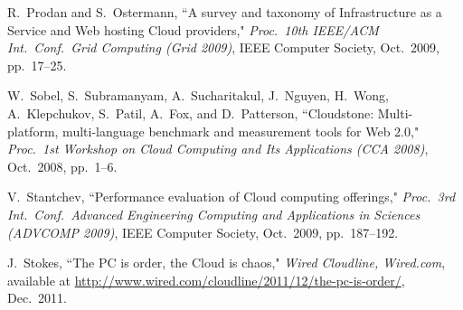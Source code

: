\documentclass[10pt, conference, compsocconf]{IEEEtran}
\begin{document}
\begin{thebibliography}{99}
R.~Prodan and S.~Ostermann, ``A survey and taxonomy of Infrastructure as a Service and Web hosting Cloud providers," \emph{Proc.~10th IEEE/ACM Int.~Conf.~Grid Computing (Grid 2009)}, IEEE Computer Society, Oct.~2009, pp.~17--25.

W.~Sobel, S.~Subramanyam, A.~Sucharitakul, J.~Nguyen, H.~Wong, A.~Klepchukov, S.~Patil, A.~Fox, and D.~Patterson, ``Cloudstone: Multi-platform, multi-language benchmark and measurement tools for Web 2.0," \emph{Proc.~1st Workshop on Cloud Computing and Its Applications (CCA 2008)}, Oct.~2008, pp.~1--6.

V.~Stantchev, ``Performance evaluation of Cloud computing offerings," \emph{Proc.~3rd Int.~Conf.~Advanced Engineering Computing and Applications in Sciences (ADVCOMP 2009)}, IEEE Computer Society, Oct.~2009, pp.~187--192.

J.~Stokes, ``The PC is order, the Cloud is chaos," \emph{Wired Cloudline, Wired.com}, available at \url{http://www.wired.com/cloudline/2011/12/the-pc-is-order/}, Dec.~2011.

\end{thebibliography}
\end{document}
